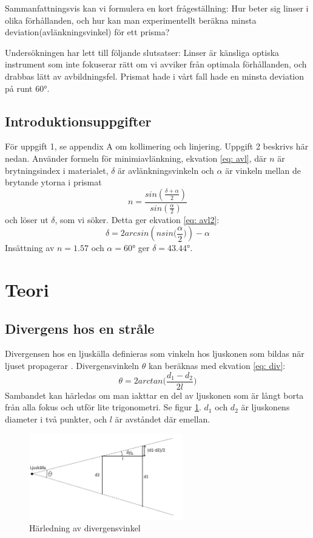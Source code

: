 \documentclass[a4paper]{article}
\begin{document}
Sammanfattningsvis kan vi formulera en kort frågeställning: Hur beter sig linser i olika förhållanden, och hur kan man experimentellt beräkna minsta 
deviation(avlänkningsvinkel) för ett prisma?

Undersökningen har lett till följande slutsatser: Linser är känsliga optiska instrument som inte fokuserar rätt om vi avviker från optimala förhållanden,
och drabbas lätt av avbildningsfel. Prismat hade i vårt fall hade en minsta deviation på runt \ang{60}. 
\subsection{Introduktionsuppgifter}
För uppgift 1, se appendix A om kollimering och linjering. 
Uppgift 2 beskrivs här nedan.
Använder formeln för minimiavlänkning, ekvation \ref{eq: avl}\cite[p. 212]{vl}, där $n$ är brytningsindex i materialet, $\delta$ är avlänkningsvinkeln och 
$\alpha$ är vinkeln mellan de brytande ytorna i prismat
\begin{equation}
    \label{eq: avl}
    n = \frac{sin(\frac{\delta +\alpha}{2})}{sin(\frac{\alpha}{2})}
\end{equation}
och löser ut $\delta$, som vi söker. Detta ger ekvation \ref{eq: avl2}:
\begin{equation}
    \label{eq: avl2}
    \delta = 2 arcsin(n sin\big(\frac{\alpha}{2}\big)) - \alpha
\end{equation}
Insättning av $n=1.57$ och $\alpha = \ang{60}$ ger $\delta = \ang{43.44}$.

\section{Teori}
\subsection{Divergens hos en stråle}
Divergensen hos en ljuskälla definieras som vinkeln hos ljuskonen som bildas när ljuset propagerar \cite{wiki}. Divergensvinkeln $\theta$ kan beräknas med ekvation \ref{eq: div}:
\begin{equation}
    \theta = 2 arctan\Big(\frac{d_1 - d_2}{2l}\Big)
    \label{eq: div}
\end{equation}
Sambandet kan härledas om man iakttar en del av ljuskonen som är långt borta från alla fokus och utför lite trigonometri. Se figur \ref{fig:divergens}. $d_1$ och $d_2$
är ljuskonens diameter i två punkter, och $l$ är avståndet där emellan.  
\begin{figure}[h!]
    \centering
    \includegraphics[width=0.6\textwidth]{divergens}
    \caption{Härledning av divergensvinkel}
    \label{fig:divergens}
\end{figure}
\pagebreak
\end{document}
